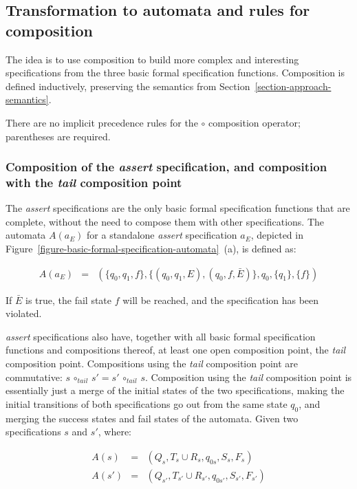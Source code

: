 \documentclass[a4paper,11pt]{kth-mag}
\begin{document}
\subsection{Transformation to automata and rules for composition}
\label{section-approach-composition}
\lstset{language=Python,numbers=none}

The idea is to use composition to build more complex and interesting
specifications from the three basic formal specification functions. Composition
is defined inductively, preserving the semantics from
Section~\ref{section-approach-semantics}.

There are no implicit precedence rules for the $\circ$ composition operator;
parentheses are required.


\subsubsection{Composition of the \textit{assert} specification, and
composition with the \textit{tail} composition point}

The \textit{assert} specifications are the only basic formal specification
functions that are complete, without the need to compose them with other
specifications. The automata $A(a_E)$ for a standalone \textit{assert}
specification $a_E$, depicted in
Figure~\ref{figure-basic-formal-specification-automata}~(a), is defined as:

\medskip
\[
  \begin{array}{rcl}
    A(a_E) & = & (\{q_0, q_1, f\}, \{(q_0, q_1, E), (q_0, f, \bar{E})\}, q_0, \{q_1\}, \{f\})
  \end{array}
\]
\medskip

If $\bar{E}$ is true, the fail state $f$ will be reached, and the specification
has been violated.

\textit{assert} specifications also have, together with all basic formal
specification functions and compositions thereof, at least one open composition
point, the \textit{tail} composition point. Compositions using the
\textit{tail} composition point are commutative: $s \, \circ_{tail} \, s' = s'
\, \circ_{tail} \, s$. Composition using the \textit{tail} composition point is
essentially just a merge of the initial states of the two specifications,
making the initial transitions of both specifications go out from the same
state $q_0$, and merging the success states and fail states of the automata. Given two
specifications $s$ and $s'$, where:

\medskip
\[
  \begin{array}{rcl}
    A(s) & = & (Q_s, T_s \cup R_s, q_{0s}, S_s, F_s) \\
   A(s') & = & (Q_{s'}, T_{s'} \cup R_{s'}, q_{0s'}, S_{s'}, F_{s'})
  \end{array}
\]
\medskip
\end{document}
